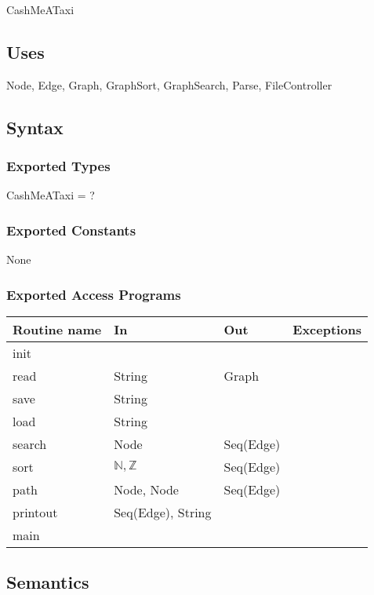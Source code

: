 \documentclass[12pt]{article}
\begin{document}
CashMeATaxi

\subsection*{Uses}

Node, Edge, Graph, GraphSort, GraphSearch, Parse, FileController

\subsection*{Syntax}

\subsubsection*{Exported Types}

CashMeATaxi = ?

\subsubsection*{Exported Constants}

None

\subsubsection*{Exported Access Programs}

\begin{tabular}{| l | l | l | l |}
	\hline
	\textbf{Routine name} & \textbf{In} & \textbf{Out} & \textbf{Exceptions}\\
	\hline
	init & ~ & ~ & ~\\
	\hline
	read & String & Graph & ~\\
	\hline
	save & String & ~ & ~\\
	\hline
	load & String & ~ & ~\\
	\hline
	search & Node & Seq(Edge) & ~\\
	\hline
	sort & $\mathbb{N}, \mathbb{Z}$ & Seq(Edge) & ~\\
	\hline
	path & Node, Node & Seq(Edge) & ~\\
	\hline
	printout & Seq(Edge), String & ~ & ~\\
	\hline
	main & ~ & ~ & ~\\
	\hline
\end{tabular}

\subsection*{Semantics}
\end{document}
